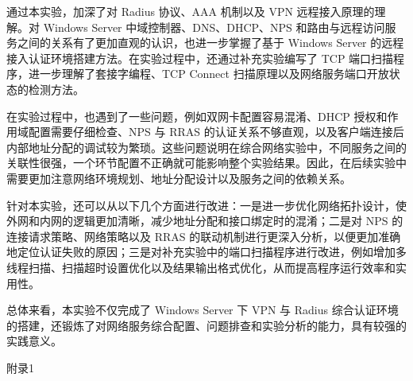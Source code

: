 \documentclass[12pt]{ctexart}
\begin{document}
通过本实验，加深了对 Radius 协议、AAA 机制以及 VPN 远程接入原理的理解。对 Windows Server 中域控制器、DNS、DHCP、NPS 和路由与远程访问服务之间的关系有了更加直观的认识，也进一步掌握了基于 Windows Server 的远程接入认证环境搭建方法。在实验过程中，还通过补充实验编写了 TCP 端口扫描程序，进一步理解了套接字编程、TCP Connect 扫描原理以及网络服务端口开放状态的检测方法。

在实验过程中，也遇到了一些问题，例如双网卡配置容易混淆、DHCP 授权和作用域配置需要仔细检查、NPS 与 RRAS 的认证关系不够直观，以及客户端连接后内部地址分配的调试较为繁琐。这些问题说明在综合网络实验中，不同服务之间的关联性很强，一个环节配置不正确就可能影响整个实验结果。因此，在后续实验中需要更加注意网络环境规划、地址分配设计以及服务之间的依赖关系。

针对本实验，还可以从以下几个方面进行改进：一是进一步优化网络拓扑设计，使外网和内网的逻辑更加清晰，减少地址分配和接口绑定时的混淆；二是对 NPS 的连接请求策略、网络策略以及 RRAS 的联动机制进行更深入分析，以便更加准确地定位认证失败的原因；三是对补充实验中的端口扫描程序进行改进，例如增加多线程扫描、扫描超时设置优化以及结果输出格式优化，从而提高程序运行效率和实用性。

总体来看，本实验不仅完成了 Windows Server 下 VPN 与 Radius 综合认证环境的搭建，还锻炼了对网络服务综合配置、问题排查和实验分析的能力，具有较强的实践意义。

{\heiti{} 附录1}
\end{document}

